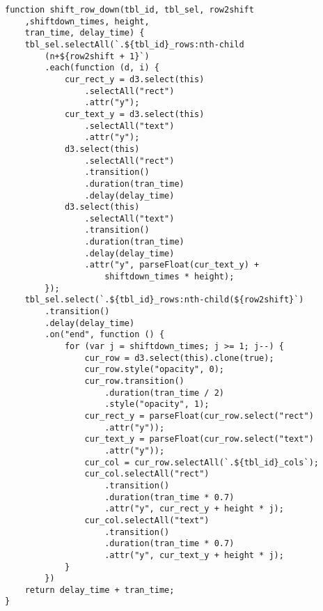 \begin{lstlisting}
function shift_row_down(tbl_id, tbl_sel, row2shift
    ,shiftdown_times, height,
    tran_time, delay_time) {
    tbl_sel.selectAll(`.${tbl_id}_rows:nth-child
        (n+${row2shift + 1}`)
        .each(function (d, i) {
            cur_rect_y = d3.select(this)
                .selectAll("rect")
                .attr("y");
            cur_text_y = d3.select(this)
                .selectAll("text")
                .attr("y");
            d3.select(this)
                .selectAll("rect")
                .transition()
                .duration(tran_time)
                .delay(delay_time)
            d3.select(this)
                .selectAll("text")
                .transition()
                .duration(tran_time)
                .delay(delay_time)
                .attr("y", parseFloat(cur_text_y) + 
                    shiftdown_times * height);
        });
    tbl_sel.select(`.${tbl_id}_rows:nth-child(${row2shift}`)
        .transition()
        .delay(delay_time)
        .on("end", function () {
            for (var j = shiftdown_times; j >= 1; j--) {
                cur_row = d3.select(this).clone(true);
                cur_row.style("opacity", 0);
                cur_row.transition()
                    .duration(tran_time / 2)
                    .style("opacity", 1);
                cur_rect_y = parseFloat(cur_row.select("rect")
                    .attr("y"));
                cur_text_y = parseFloat(cur_row.select("text")
                    .attr("y"));
                cur_col = cur_row.selectAll(`.${tbl_id}_cols`);
                cur_col.selectAll("rect")
                    .transition()
                    .duration(tran_time * 0.7)
                    .attr("y", cur_rect_y + height * j);
                cur_col.selectAll("text")
                    .transition()
                    .duration(tran_time * 0.7)
                    .attr("y", cur_text_y + height * j);
            }
        })
    return delay_time + tran_time;
}


\end{lstlisting}
